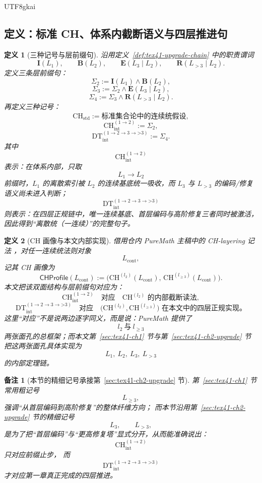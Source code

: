 \documentclass[12pt]{article}
\newtheorem{definition}{定义}[section]
\newtheorem{remark}{备注}[section]
\newcommand{\CHstd}{\mathrm{CH}_{\mathrm{std}}}
\newcommand{\CHint}{\mathrm{CH}_{\mathrm{int}}}
\newcommand{\DTint}{\mathrm{DT}_{\mathrm{int}}}
\newcommand{\CHProfileOp}{\mathsf{CHProfile}}
\begin{document}
\begin{CJK*}{UTF8}{gkai}
\subsection{定义：标准 CH、体系内截断语义与四层推进句}
\label{subsec:tex41-ch-confirmation-defs}

\begin{definition}[三种记号与层前缀句]
\label{def:tex41-ch-confirmation-notations}
沿用定义~\ref{def:tex41-upgrade-chain} 中的职责谓词
\[
  \mathbf I(L_1),\qquad
  \mathbf B(L_2),\qquad
  \mathbf E(L_3\mid L_2),\qquad
  \mathbf R(L_{>3}\mid L_2).
\]
定义三条层前缀句：
\[
  \Sigma_2
  :=
  \mathbf I(L_1)\wedge \mathbf B(L_2),
\]
\[
  \Sigma_3
  :=
  \Sigma_2\wedge \mathbf E(L_3\mid L_2),
\]
\[
  \Sigma_4
  :=
  \Sigma_3\wedge \mathbf R(L_{>3}\mid L_2).
\]
再定义三种记号：
\[
  \CHstd
  :=\text{标准集合论中的连续统假设},
\]
\[
  \CHint^{(1\to2)}
  :=\Sigma_2,
\]
\[
  \DTint^{(1\to2\to3\to\text{>3})}
  :=\Sigma_4.
\]
其中
\[
  \CHint^{(1\to2)}
\]
表示：在体系内部，只取
\[
  L_1\to L_2
\]
前缀时，$L_1$ 的离散索引被 $L_2$ 的连续基底统一吸收，而 $L_3$ 与 $L_{>3}$ 的编码/修复语义尚未进入判断；
\[
  \DTint^{(1\to2\to3\to\text{>3})}
\]
则表示：在四层正规链中，唯一连续基底、首层编码与高阶修复三者同时被激活，因此得到“离散统（一连续）”的完整句子。
\end{definition}

\begin{definition}[CH 画像与本文内部实现]
\label{def:tex41-ch-confirmation-profile}
借用仓内 PureMath 主稿中的 CH-layering 记法
\cite{GaoZheng2025GFramework}，对任一连续统法则对象
\[
  L_{\mathrm{cont}},
\]
记其 CH 画像为
\[
  \CHProfileOp(L_{\mathrm{cont}})
  :=
  \bigl(
    \mathrm{CH}^{(l_2)}(L_{\mathrm{cont}}),\,
    \mathrm{CH}^{(l_{\ge3})}(L_{\mathrm{cont}})
  \bigr).
\]
本文把该双面结构与层前缀句对应为：
\[
  \CHint^{(1\to2)}
  \quad\text{对应}\quad
  \mathrm{CH}^{(l_2)}
  \text{ 的内部截断读法},
\]
\[
  \DTint^{(1\to2\to3\to\text{>3})}
  \quad\text{对应}\quad
  \bigl(
    \mathrm{CH}^{(l_2)},
    \mathrm{CH}^{(l_{\ge3})}
  \bigr)
  \text{ 在本文中的四层正规实现。}
\]
这里“对应”不是说两边逐字同义，而是说：PureMath 提供了
\[
  l_2\ \text{与}\ l_{\ge3}
\]
两张面孔的总框架；而本文第~\ref{sec:tex41-ch1} 节与第~\ref{sec:tex41-ch2-upgrade} 节把这两张面孔具体实现为
\[
  L_1,\ L_2,\ L_3,\ L_{>3}
\]
的内部定理链。
\end{definition}

\begin{remark}[本节的精细记号承接第~\ref{sec:tex41-ch2-upgrade} 节]
第~\ref{sec:tex41-ch1} 节常用粗记号
\[
  L_{\ge3},
\]
强调“从首层编码到高阶修复”的整体纤维方向；
而本节沿用第~\ref{sec:tex41-ch2-upgrade} 节的精细记号
\[
  L_3,\qquad L_{>3},
\]
是为了把“首层编码”与“更高修复塔”显式分开，从而能准确说出：
\[
  \CHint^{(1\to2)}
\]
只对应前缀止步，
而
\[
  \DTint^{(1\to2\to3\to\text{>3})}
\]
才对应第一章真正完成的四层推进。
\end{remark}


\end{CJK*}
\end{document}
